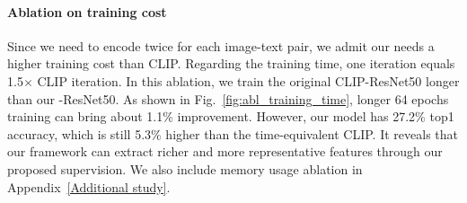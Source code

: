






\paragraph{Ablation on training cost} Since we need to encode twice for each image-text pair, we admit our \workname needs a higher training cost than CLIP. 
Regarding the training time, one \workname iteration equals 1.5$\times$ CLIP iteration. 
In this ablation, we train the original CLIP-ResNet50 longer than our \workname-ResNet50. As shown in Fig.~\ref{fig:abl_training_time}, longer 64 epochs training can bring about 1.1\% improvement. However, our model has 27.2\% top1 accuracy, which is still 5.3\% higher than the time-equivalent CLIP. It reveals that our framework can extract richer and more representative features through our proposed supervision. We also include memory usage ablation in Appendix~\ref{Additional study}.


